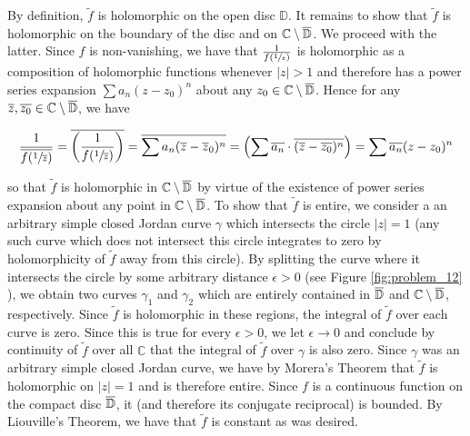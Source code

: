 \begin{solution}
    By definition, $\tilde{f}$ is holomorphic on the open disc $\mathbb{D}$. It remains to show that $\tilde{f}$ is 
    holomorphic on the boundary of the disc and on $\mathbb{C} \setminus \overline{\mathbb{D}}$. We proceed with the latter. Since $f$ 
    is non-vanishing, we have that $\frac{1}{f(\sfrac{1}{z})}$ is holomorphic as a composition of holomorphic functions 
    whenever $|z| > 1$ and therefore has a power series expansion $\sum a_n (z - z_0)^n$ about any 
    $z_0 \in \mathbb{C} \setminus \overline{\mathbb{D}}$. Hence for any 
    $\overline{z}, \overline{z_0} \in \mathbb{C} \setminus{\overline{\mathbb{D}}}$, we have 

    $$
    \frac{1}{\overline{f(\sfrac{1}{\overline{z}})}}
    = \overline{\left(\frac{1}{f(\sfrac{1}{\overline{z}})} \right)} 
    = \overline{\sum a_n (\overline{z} - \overline{z}_0)^n}
    = \left( \sum \overline{a_n} \cdot \overline{(\overline{z} - \overline{z_0})^n} \right)
    = \sum \overline{a_n} (z - z_0)^n
    $$

    so that $\tilde{f}$ is holomorphic in $\mathbb{C} \setminus \overline{\mathbb{D}}$ by virtue of the existence of power series 
    expansion about any point in $\mathbb{C} \setminus \overline{\mathbb{D}}$. To show that $\tilde{f}$ is entire, we consider a 
    an arbitrary simple closed Jordan curve $\gamma$ which intersects the circle $|z| = 1$ (any such curve which does 
    not intersect this circle integrates to zero by holomorphicity of $\tilde{f}$ away from this circle). By splitting 
    the curve where it intersects the circle by some arbitrary distance $\epsilon > 0$ (see Figure \ref{fig:problem_12}
    ), we obtain two curves $\gamma_1$ and $\gamma_2$ which are entirely contained in $\overline{\mathbb{D}}$ and 
    $\mathbb{C} \setminus \overline{\mathbb{D}}$, respectively. Since $\tilde{f}$ is holomorphic in these regions, the integral of 
    $\tilde{f}$ over each curve is zero.  Since this is true for every $\epsilon > 0$, we let $\epsilon \to 0$ and 
    conclude by continuity of $\tilde{f}$ over all $\mathbb{C}$ that the integral of $\tilde{f}$ over $\gamma$ is also 
    zero. Since $\gamma$ was an arbitrary simple closed Jordan curve, we have by Morera's Theorem that $\tilde{f}$ is 
    holomorphic on $|z| = 1$ and is therefore entire. Since $f$ is a continuous function on the compact disc $\overline{\mathbb{D}}$, 
    it (and therefore its conjugate reciprocal) is bounded. By Liouville's Theorem, we have that $\tilde{f}$ is constant 
    as was desired.

    \vspace{1.0em}


\end{solution}
